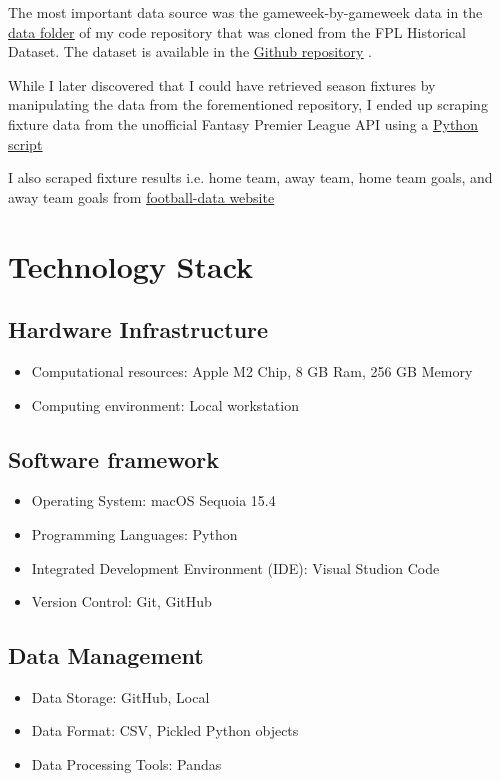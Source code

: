 The most important data source was the gameweek-by-gameweek data in the \href{https://github.com/MUN3N3Z/FPL_AI/tree/main/data}{\underline{data folder}} of my code repository that was cloned from the FPL Historical Dataset. The dataset is available in the \href{https://github.com/vaastav/Fantasy-Premier-League/tree/master}{\underline{Github repository}} \cite{anand2016fantasypremierleague}.

While I later discovered that I could have retrieved season fixtures by manipulating the data from the forementioned repository, I ended up scraping fixture data from the unofficial Fantasy Premier League API using a \href{https://github.com/MUN3N3Z/FPL_AI/tree/main/scripts/save_season_fixtures.py}{\underline{Python script}}

I also scraped fixture results i.e. home team, away team, home team goals, and away team goals from \href{www.football-data.co.uk}{football-data website}

\section{Technology Stack}
\subsection{Hardware Infrastructure}

\begin{itemize}
    \item Computational resources: Apple M2 Chip, 8 GB Ram, 256 GB Memory
    \item Computing environment: Local workstation
\end{itemize}

\subsection{Software framework}
\begin{itemize}
    \item Operating System: macOS Sequoia 15.4
    \item Programming Languages: Python
    \item Integrated Development Environment (IDE): Visual Studion Code
    \item Version Control: Git, GitHub
\end{itemize}

\subsection{Data Management}
\begin{itemize}
    \item Data Storage: GitHub, Local
    \item Data Format: CSV, Pickled Python objects
    \item Data Processing Tools: Pandas
\end{itemize}

